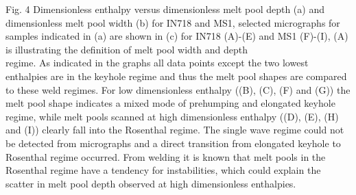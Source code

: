 \documentclass[10pt]{article}
\begin{document}
Fig. 4 Dimensionless enthalpy versus dimensionless melt pool depth (a) and dimensionless melt pool width (b) for IN718 and MS1, selected micrographs for samples indicated in (a) are shown in (c) for IN718 (A)-(E) and MS1 (F)-(I), (A) is illustrating the definition of melt pool width and depth\\
regime. As indicated in the graphs all data points except the two lowest enthalpies are in the keyhole regime and thus the melt pool shapes are compared to these weld regimes. For low dimensionless enthalpy ((B), (C), (F) and (G)) the melt pool shape indicates a mixed mode of prehumping and elongated keyhole regime, while melt pools scanned at high dimensionless enthalpy ((D), (E), (H) and (I)) clearly fall into the Rosenthal regime. The single wave regime could not be detected from micrographs and a direct transition from elongated keyhole to Rosenthal regime occurred. From welding it is known that melt pools in the Rosenthal regime have a tendency for instabilities, which could explain the scatter in melt pool depth observed at high dimensionless enthalpies.
\end{document}
